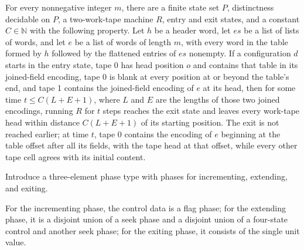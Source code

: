 \begin{theorem}
\label{Turing.rt_appendSymbol_run}
\leanok
{}
For every nonnegative integer $m$, there are a finite state set $P$, distinctness
decidable on $P$, a two-work-tape machine $R$, entry and exit states, and a constant
$C\in\mathbb{N}$ with the following property. Let $h$ be a header word, let $es$ be a
list of lists of words, and let $e$ be a list of words of length $m$, with every word in
the table formed by $h$ followed by the flattened entries of $es$ nonempty. If a
configuration $d$ starts in the entry state, tape 0 has head position $o$ and contains
that table in its joined-field encoding, tape 0 is blank at every position at or beyond
the table's end, and tape 1 contains the joined-field encoding of $e$ at its head, then
for some time $t\le C(L+E+1)$, where $L$ and $E$ are the lengths of those two joined
encodings, running $R$ for $t$ steps reaches the exit state and leaves every work-tape
head within distance $C(L+E+1)$ of its starting position. The exit is not reached
earlier; at time $t$, tape 0 contains the encoding of $e$ beginning at the table offset
after all its fields, with the tape head at that offset, while every other tape cell
agrees with its initial content.
\end{theorem}

\begin{definition}
\label{Turing.rt_succPhase}
\leanok
Introduce a three-element phase type with phases for incrementing, extending, and
exiting.
\end{definition}

\begin{definition}
\label{Turing.rt_succControl}
\leanok
{}
For the incrementing phase, the control data is a flag phase; for the extending phase,
it is a disjoint union of a seek phase and a disjoint union of a four-state control and
another seek phase; for the exiting phase, it consists of the single unit value.
\end{definition}

